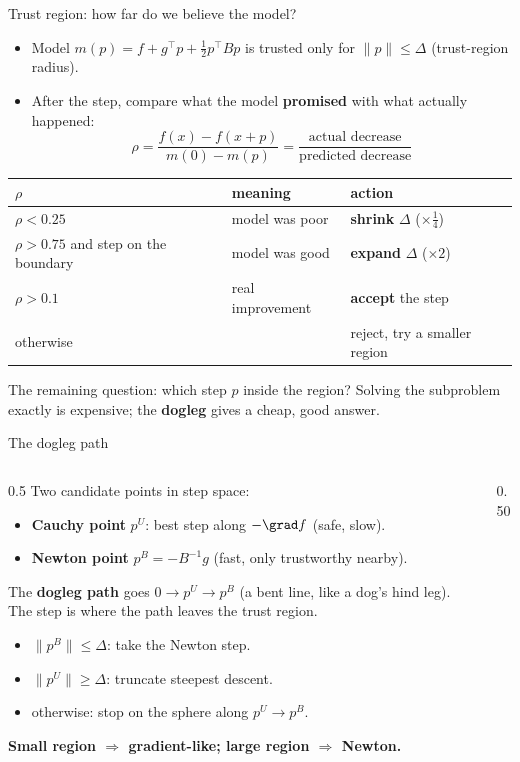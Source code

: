 \begin{frame}{Trust region: how far do we believe the model?}
  \begin{itemize}
    \item Model $m(p)=f+g^\top p+\tfrac12p^\top Bp$ is trusted only for $\|p\|\le\Delta$ (trust-region radius).
    \item After the step, compare what the model \textbf{promised} with what actually happened:
    \[ \rho=\frac{f(x)-f(x+p)}{m(0)-m(p)}=\frac{\text{actual decrease}}{\text{predicted decrease}} \]
  \end{itemize}
  \begin{center}\small
  \begin{tabular}{lll}
    \toprule
    $\rho$ & meaning & action\\
    \midrule
    $\rho<0.25$ & model was poor & \textbf{shrink} $\Delta$ ($\times\frac14$)\\
    $\rho>0.75$ and step on the boundary & model was good & \textbf{expand} $\Delta$ ($\times2$)\\
    $\rho>0.1$ & real improvement & \textbf{accept} the step\\
    otherwise & & reject, try a smaller region\\
    \bottomrule
  \end{tabular}
  \end{center}
  \small The remaining question: which step $p$ inside the region? Solving the subproblem exactly is expensive; the \textbf{dogleg} gives a cheap, good answer.
\end{frame}

\begin{frame}{The dogleg path}
  \begin{columns}[T]
    \begin{column}{0.5\textwidth}
      \small
      Two candidate points in step space:
      \begin{itemize}
        \item \textbf{Cauchy point} $p^U$: best step along $-\grad f$ (safe, slow).
        \item \textbf{Newton point} $p^B=-B^{-1}g$ (fast, only trustworthy nearby).
      \end{itemize}
      The \textbf{dogleg path} goes $0\to p^U\to p^B$ (a bent line, like a dog's hind leg). The step is where the path leaves the trust region.
      \begin{itemize}
        \item $\|p^B\|\le\Delta$: take the Newton step.
        \item $\|p^U\|\ge\Delta$: truncate steepest descent.
        \item otherwise: stop on the sphere along $p^U\to p^B$.
      \end{itemize}
      \textbf{Small region $\Rightarrow$ gradient-like; large region $\Rightarrow$ Newton.}
    \end{column}
    \begin{column}{0.50\textwidth}
    \end{column}
  \end{columns}
\end{frame}

